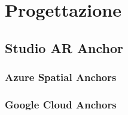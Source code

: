 
\chapter{Progettazione}
\label{cap:progettazione}
\section{Studio AR Anchor}
\label{sec:ar-anchor}
\subsection{Azure Spatial Anchors}
\label{subsec:asa}
\subsection{Google Cloud Anchors}
\label{subsec:gca}


